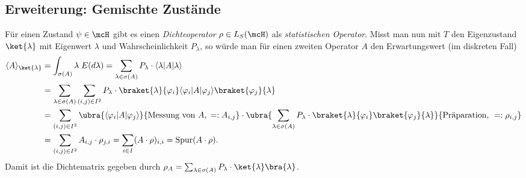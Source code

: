 \documentclass{subfiles}
\begin{document}
    \subsection{Erweiterung: Gemischte Zustände}
        Für einen Zustand $\psi\in\mcH$ gibt es einen \emph{Dichteoperator} $\rho\in L_S(\mcH)$ als \emph{statistischen Operator}. Misst man nun mit $T$ den Eigenzustand $\ket{\lambda}$ mit Eigenwert $\lambda$ und Wahrscheinlichkeit $P_\lambda$, so würde man für einen zweiten Operator $A$ den Erwartungswert (im diskreten Fall)
        \begin{align*}
            \langle A\rangle_\ket{\lambda} &= \int_{\sigma(A)}\lambda\;E(d\lambda) = \sum_{\lambda\in\sigma(A)} P_\lambda\cdot\langle\lambda|A|\lambda\rangle  \\
            &=\sum_{\lambda\in\sigma(A)}\sum_{(i,j)\in I^2} P_\lambda\cdot\braket{\lambda}{\varphi_i}\langle\varphi_i|A|\varphi_j\rangle\braket{\varphi_j}{\lambda} \\
            &= \sum_{(i,j)\in I^2}\ubra{\langle\varphi_i|A|\varphi_j\rangle}{\text{Messung von }A,\;=:A_{i,j}}\cdot \ubra{\sum_{\lambda\in\sigma(A)} P_\lambda\cdot\braket{\lambda}{\varphi_i}\braket{\varphi_j}{\lambda}}{\text{Präparation, }=:\rho_{i,j}} \\
            &= \sum_{(i,j)\in I^2}A_{i,j}\cdot\rho_{j,i} = \sum_{i\in I} (A\cdot\rho)_{i,i} = \text{Spur}(A\cdot\rho).
        \end{align*}
        Damit ist die Dichtematrix gegeben durch $\rho_A = \sum_{\lambda\in\sigma(A)}P_\lambda\cdot\ket{\lambda}\bra{\lambda}$. 
\end{document}
